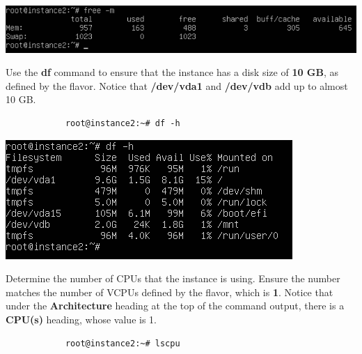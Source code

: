 \documentclass[letterpaper, 12pt]{article}
\begin{document}
\begin{enumerate}
\begin{labstep}
        \begin{center}
            \includegraphics[width=\linewidth]{images/part5/step7.png}
        \end{center}
    \end{labstep}

    \begin{labstep}
        Use the \textbf{df} command to ensure that the instance has a disk size of \textbf{10 GB}, as defined by the flavor.
        Notice that \textbf{/dev/vda1} and \textbf{/dev/vdb} add up to almost 10 GB.
        \begin{lstlisting}
            root@instance2:~# df -h
        \end{lstlisting}

        \begin{center}
            \includegraphics[width=\linewidth]{images/part5/step8.png}
        \end{center}
    \end{labstep}

    \begin{labstep}
        Determine the number of CPUs that the instance is using.
        Ensure the number matches the number of VCPUs defined by the flavor, which is \textbf{1}.
        Notice that under the \textbf{Architecture} heading at the top of the command output, there is a \textbf{CPU(s)} heading, whose value is 1. %
        \begin{lstlisting}
            root@instance2:~# lscpu
        \end{lstlisting}


\end{labstep}
\end{enumerate}
\end{document}
